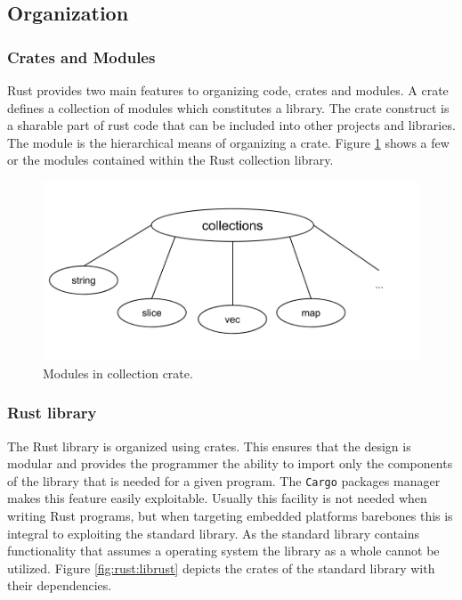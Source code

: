 \subsection{Organization}
\label{ssub:rust:organization}

\subsubsection{Crates and Modules}

Rust provides two main features to organizing code, crates and modules.
A crate defines a collection of modules which constitutes a library.
The crate construct is a sharable part of rust code that can be included into other projects and libraries.
The module is the hierarchical means of organizing a crate.
Figure \ref{fig:rust:collections} shows a few or the modules contained within the Rust collection library.

\begin{figure}[H]
  \begin{center}
    \includegraphics[scale=0.3]{figures/background/rust/libcollections.png}
  \end{center}
  \caption{Modules in collection crate.}
  \label{fig:rust:collections}
\end{figure}

\subsubsection{Rust library}

The Rust library is organized using crates.
This ensures that the design is modular and provides the programmer the ability to import only the components of the library that is needed for a given program.
The \texttt{Cargo} packages manager makes this feature easily exploitable.
Usually this facility is not needed when writing Rust programs, but when targeting embedded platforms barebones  this is integral to exploiting the standard library.
As the standard library contains functionality that assumes a operating system the library as a whole cannot be utilized.
Figure \ref{fig:rust:librust} depicts the crates of the standard library with their dependencies.

